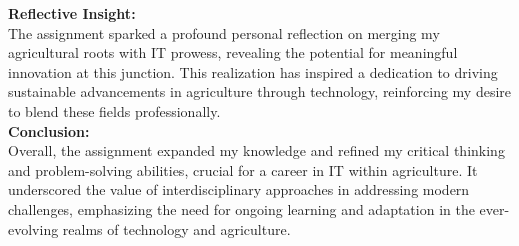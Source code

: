 \documentclass[12pt,a4paper]{article}
\begin{document}
\noindent \textbf{Reflective Insight:} \\The assignment sparked a profound personal reflection on merging my agricultural roots with IT prowess, revealing the potential for meaningful innovation at this junction. This realization has inspired a dedication to driving sustainable advancements in agriculture through technology, reinforcing my desire to blend these fields professionally.\\

\noindent \textbf{Conclusion:} \\Overall, the assignment expanded my knowledge and refined my critical thinking and problem-solving abilities, crucial for a career in IT within agriculture. It underscored the value of interdisciplinary approaches in addressing modern challenges, emphasizing the need for ongoing learning and adaptation in the ever-evolving realms of technology and agriculture.\\



\pagebreak




	
\def\UrlBreaks{\do\/\do-}

\clearpage
\end{document}
